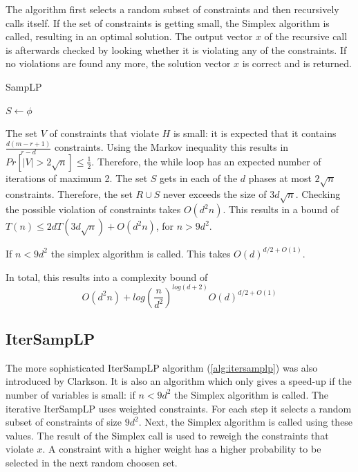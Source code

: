 \documentclass[nocopyrightspace]{acm_proc_article-sp}
\begin{document}
The algorithm first selects a random subset of constraints and then recursively calls itself. If the set of constraints is getting small, the Simplex algorithm is called, resulting in an optimal solution. The output vector $x$ of the recursive call is afterwards checked by looking whether it is violating any of the constraints. If no violations are found any more, the solution vector $x$ is correct and is returned. 

\begin{algorithm}[h]
\label{alg:samplp}
\caption{SampLP}
$S \gets \phi$\;
\end{algorithm}

The set $V$ of constraints that violate $H$ is small: it is expected that it contains  $\frac{d(m-r+1)}{r-d}$ constraints. Using the Markov inequality this results in $Pr[|V|>2\sqrt{n}]\leq \frac{1}{2}$. Therefore, the while loop has an expected number of iterations of maximum 2. The set $S$ gets in each of the $d$ phases at most $2\sqrt{n}$ constraints. Therefore, the set $R \cup S$  never exceeds the size of $3d\sqrt{n}$. Checking the possible violation of constraints takes $O(d^2n)$. This results in a bound of $T(n) \leq 2dT(3d\sqrt{n})+O(d^2n)$, for $n>9d^2$. 

If $n<9d^2$ the simplex algorithm is called. This takes  $O(d)^{d/2+O(1)}$. 

In total, this results into a complexity bound of
\begin{equation}
O(d^2n)+log(\frac{n}{d^2})^{log(d+2)}O(d)^{d/2+O(1)}
\end{equation}

\subsection{IterSampLP}
The more sophisticated IterSampLP algorithm (\ref{alg:itersamplp}) was also introduced by Clarkson\cite{clarkson1995vegas}. It is also an algorithm which only gives a speed-up if the number of variables is small: if $n<9d^2$ the Simplex algorithm is called. The iterative IterSampLP uses weighted constraints. For each step it selects a random subset of constraints of size $9d^2$. Next, the Simplex algorithm is called using these values. The result of the Simplex call is used to reweigh the constraints that violate $x$. A constraint with a higher weight has a higher probability to be selected in the next random choosen set. 
\end{document}
